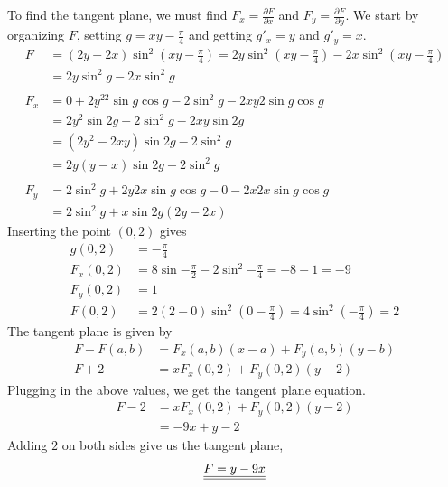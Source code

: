 \documentclass[a4paper,norsk,12pt]{article}
\begin{document}
To find the tangent plane, we must find $F_x = \frac{\partial F}{\partial x}$
and $F_y = \frac{\partial F}{\partial y}$. We start by organizing $F$, setting
$g=xy-\frac{\pi}{4}$ and getting $g'_x=y$ and $g'_y=x$.
%
\begin{align*}
  F &= (2y-2x)\sin^2{(xy-\frac{\pi}{4})}
      = 2y\sin^2{(xy-\frac{\pi}{4})} - 2x\sin^2{(xy-\frac{\pi}{4})} \\
      &= 2y\sin^2{g}-2x\sin^2{g} \\
\\
  F_x &= 0+2y^22\sin{g}\cos{g} -2\sin^2{g} - 2xy2\sin{g}\cos{g} \\
      &= 2y^2\sin{2g} - 2\sin^2{g} - 2xy\sin{2g} \\
      &= (2y^2-2xy)\sin{2g} - 2\sin^2{g} \\
      &= 2y(y-x)\sin{2g} - 2\sin^2{g} \\
\\
  F_y &= 2\sin^2{g} + 2y2x\sin{g}\cos{g} - 0 - 2x2x\sin{g}\cos{g} \\
      &= 2\sin^2{g} + x\sin{2g}(2y-2x)
\end{align*}
Inserting the point $(0,2)$ gives
\begin{align*}
  g(0,2) &= -\frac{\pi}{4} \\
  F_x(0,2) &= 8\sin{-\frac{\pi}{2}} - 2\sin^2{-\frac{\pi}{4}} = -8-1 = -9 \\
  F_y(0,2) &= 1 \\
  F(0,2) &= 2(2-0)\sin^2{(0-\frac{\pi}{4})} = 4\sin^2{(-\frac{\pi}{4})} = 2
\end{align*}
The tangent plane is given by
\begin{align*}
  F - F(a,b) &= F_x(a,b)(x-a) + F_y(a,b)(y-b) \\
  F + 2 &= xF_x(0,2) + F_y(0,2)(y-2)
\end{align*}
Plugging in the above values, we get the tangent plane equation.
\begin{align*}
  F - 2 &= xF_x(0,2) + F_y(0,2)(y-2) \\
        &= -9x + y - 2
\end{align*}
Adding $2$ on both sides give us the tangent plane,
\begin{align*}
  {\underline{\underline{F = y-9x}}}
\end{align*}
\end{document}
